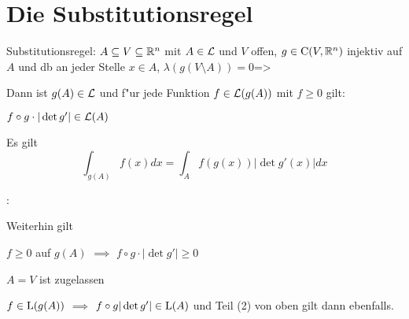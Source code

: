 \section{Die Substitutionsregel}
\theorem Substitutionsregel:
  $A\subseteq V\subseteq\mathbb R^n$ mit $A\in\mathcal{L}$ und $V$ offen,
  $g\in{\rm C}(V,\mathbb R^n)$ injektiv auf $A$ und db an jeder Stelle $x\in A$,
  $\lambda(g(V\setminus A))=0$=>{
  \label{the:int-subst}
  Dann ist $g(A)\in\mathcal{L}$ und f"ur jede Funktion $f\in\mathcal{L}(g(A))$ mit
  $f\ge 0$ gilt:
  \begin{stmts}
    \item $f\circ g \cdot |\operatorname{det} g'|\in\mathcal{L}(A)$
    \item Es gilt
      \[\int_{g(A)} f(x) dx=\int_A f(g(x)) |\det g'(x)| dx
        \]
  \end{stmts}
  }
\remark:{
  Weiterhin gilt
  \begin{stmts}
    \item $f\ge 0$ auf $g(A)$ $\implies$ $f\circ g \cdot |\det g'|\ge0$
    \item $A=V$ ist zugelassen
    \item $f\in{\rm L}(g(A))$ $\implies$ $f\circ g |\operatorname{det} g'|\in{\rm L}(A)$ und
      Teil (2) von oben gilt dann ebenfalls.
    \end{stmts}
  }
